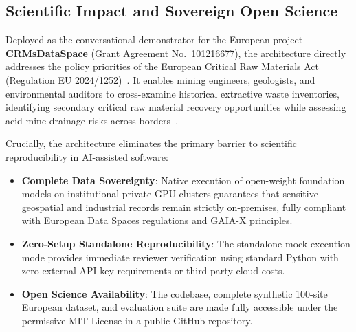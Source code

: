 \subsection{Scientific Impact and Sovereign Open Science}
\label{subsec:ScientificImpact}

Deployed as the conversational demonstrator for the European project \textbf{CRMsDataSpace} (Grant Agreement No.~101216677), the architecture directly addresses the policy priorities of the European Critical Raw Materials Act (Regulation EU 2024/1252)~\cite{european2024crma}. It enables mining engineers, geologists, and environmental auditors to cross-examine historical extractive waste inventories, identifying secondary critical raw material recovery opportunities while assessing acid mine drainage risks across borders~\cite{vidal2017environmental, lottermoser2010mine}.

Crucially, the architecture eliminates the primary barrier to scientific reproducibility in AI-assisted software:
\begin{itemize}
    \item \textbf{Complete Data Sovereignty}: Native execution of open-weight foundation models on institutional private GPU clusters guarantees that sensitive geospatial and industrial records remain strictly on-premises, fully compliant with European Data Spaces regulations and GAIA-X principles.
    \item \textbf{Zero-Setup Standalone Reproducibility}: The standalone mock execution mode provides immediate reviewer verification using standard Python with zero external API key requirements or third-party cloud costs.
    \item \textbf{Open Science Availability}: The codebase, complete synthetic 100-site European dataset, and evaluation suite are made fully accessible under the permissive MIT License in a public GitHub repository.
\end{itemize}
